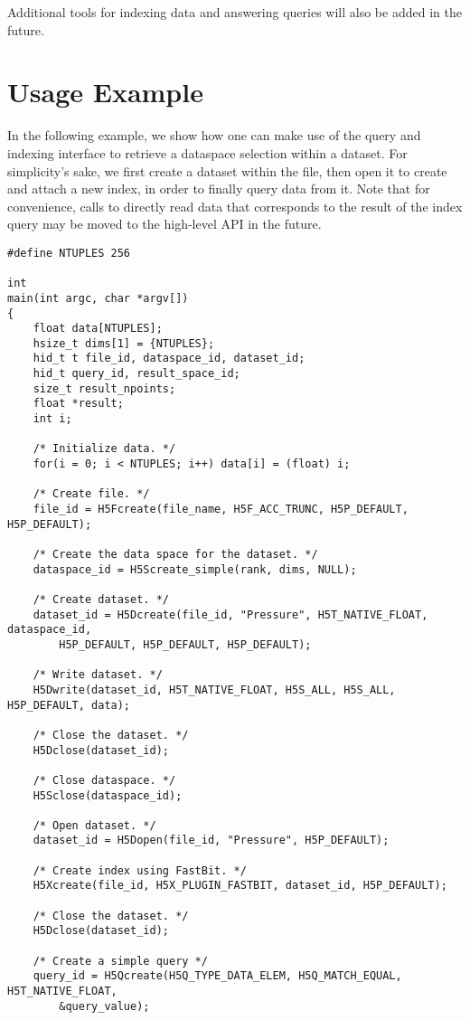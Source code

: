 Additional tools for indexing data and answering queries will also be added
in the future.

\section{Usage Example}

In the following example, we show how one can make use of the query and
indexing interface to retrieve a dataspace selection within a dataset.
For simplicity's sake, we first create a dataset within the file, then open it to
create and attach a new index, in order to finally query data from it.
Note that for convenience, calls to directly read data that corresponds to the
result of the index query may be moved to the high-level API in the future.

{
\begin{lstlisting}
#define NTUPLES 256

int
main(int argc, char *argv[])
{
    float data[NTUPLES];
    hsize_t dims[1] = {NTUPLES};
    hid_t t file_id, dataspace_id, dataset_id;
    hid_t query_id, result_space_id;
    size_t result_npoints;
    float *result;
    int i;

    /* Initialize data. */
    for(i = 0; i < NTUPLES; i++) data[i] = (float) i;

    /* Create file. */
    file_id = H5Fcreate(file_name, H5F_ACC_TRUNC, H5P_DEFAULT, H5P_DEFAULT);

    /* Create the data space for the dataset. */
    dataspace_id = H5Screate_simple(rank, dims, NULL);

    /* Create dataset. */
    dataset_id = H5Dcreate(file_id, "Pressure", H5T_NATIVE_FLOAT, dataspace_id,
        H5P_DEFAULT, H5P_DEFAULT, H5P_DEFAULT);

    /* Write dataset. */
    H5Dwrite(dataset_id, H5T_NATIVE_FLOAT, H5S_ALL, H5S_ALL, H5P_DEFAULT, data);

    /* Close the dataset. */
    H5Dclose(dataset_id);

    /* Close dataspace. */
    H5Sclose(dataspace_id);

    /* Open dataset. */
    dataset_id = H5Dopen(file_id, "Pressure", H5P_DEFAULT);

    /* Create index using FastBit. */
    H5Xcreate(file_id, H5X_PLUGIN_FASTBIT, dataset_id, H5P_DEFAULT);

    /* Close the dataset. */
    H5Dclose(dataset_id);

    /* Create a simple query */
    query_id = H5Qcreate(H5Q_TYPE_DATA_ELEM, H5Q_MATCH_EQUAL, H5T_NATIVE_FLOAT,
        &query_value);


\end{lstlisting}}
